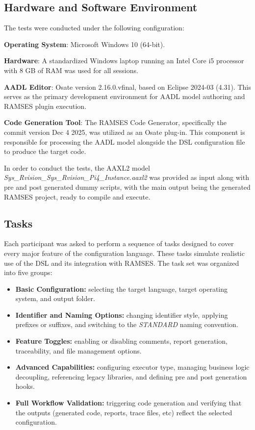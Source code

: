 \subsection{Hardware and Software Environment}
\label{sec:test_usabl_materials_env}

The tests were conducted under the following configuration:

\textbf{Operating System}: Microsoft Windows 10 (64-bit).

\textbf{Hardware}: A standardized Windows laptop running an Intel Core i5 processor with 8 GB of RAM was used for all sessions.

\textbf{\gls{AADL} Editor}: \gls{Osate} version 2.16.0.vfinal, based on Eclipse 2024-03 (4.31). This serves as the primary development environment for \gls{AADL} model authoring and \gls{RAMSES} plugin execution.

\textbf{Code Generation Tool}: The \gls{RAMSES} Code Generator, specifically the commit version Dec 4 2025, was utilized as an \gls{Osate} plug-in. This component is responsible for processing the \gls{AADL} model alongside the \gls{DSL} configuration file to produce the target code.


In order to conduct the tests, the \gls{AAXL2} model \textit{Sys\_Rvision\_Sys\_Rvision\_Pi4\_Instance.aaxl2} was provided as input along with pre and post generated dummy scripts, with the main output being the generated \gls{RAMSES} project, ready to compile and execute.


\subsection{Tasks}
\label{sec:test_usabl_tasks}

Each participant was asked to perform a sequence of tasks designed to cover every major feature of the configuration language. These tasks simulate realistic use of the \gls{DSL} and its integration with \gls{RAMSES}. The task set was organized into five groups:

\begin{itemize}
	\item \textbf{Basic Configuration:} selecting the target language, target operating system, and output folder.
	\item \textbf{Identifier and Naming Options:} changing identifier style, applying prefixes or suffixes, and switching to the \textit{STANDARD} naming convention.
	\item \textbf{Feature Toggles:} enabling or disabling comments, report generation, traceability, and file management options.
	\item \textbf{Advanced Capabilities:} configuring executor type, managing business logic decoupling, referencing legacy libraries, and defining pre and post generation hooks.
	\item \textbf{Full Workflow Validation:} triggering code generation and verifying that the outputs (generated code, reports, trace files, etc) reflect the selected configuration.
\end{itemize}

